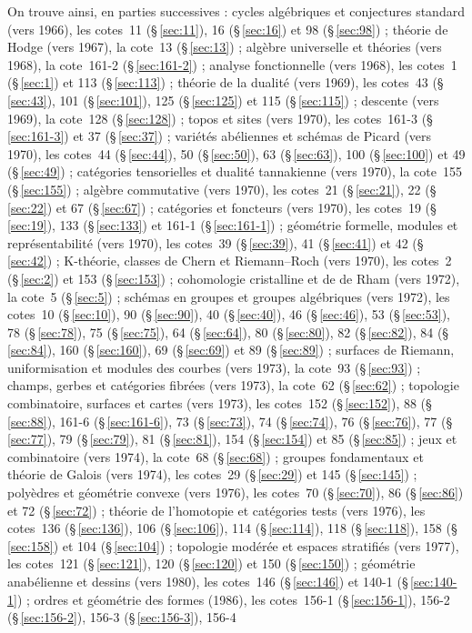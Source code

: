 \documentclass[11pt]{article}
\theoremstyle{plain}
\theoremstyle{definition}
\theoremstyle{plain}
\theoremstyle{definition}
\theoremstyle{remark}
\renewcommand{\_}{\bkunderscore\allowbreak}
\begin{document}
On trouve ainsi, en parties successives : cycles algébriques et conjectures standard (vers 1966), les cotes~11 (§\,\ref{sec:11}), 16 (§\,\ref{sec:16}) et 98 (§\,\ref{sec:98}) ; théorie de Hodge (vers 1967), la cote~13 (§\,\ref{sec:13}) ; algèbre universelle et théories (vers 1968), la cote~161-2 (§\,\ref{sec:161-2}) ; analyse fonctionnelle (vers 1968), les cotes~1 (§\,\ref{sec:1}) et 113 (§\,\ref{sec:113}) ; théorie de la dualité (vers 1969), les cotes~43 (§\,\ref{sec:43}), 101 (§\,\ref{sec:101}), 125 (§\,\ref{sec:125}) et 115 (§\,\ref{sec:115}) ; descente (vers 1969), la cote~128 (§\,\ref{sec:128}) ; topos et sites (vers 1970), les cotes~161-3 (§\,\ref{sec:161-3}) et 37 (§\,\ref{sec:37}) ; variétés abéliennes et schémas de Picard (vers 1970), les cotes~44 (§\,\ref{sec:44}), 50 (§\,\ref{sec:50}), 63 (§\,\ref{sec:63}), 100 (§\,\ref{sec:100}) et 49 (§\,\ref{sec:49}) ; catégories tensorielles et dualité tannakienne (vers 1970), la cote~155 (§\,\ref{sec:155}) ; algèbre commutative (vers 1970), les cotes~21 (§\,\ref{sec:21}), 22 (§\,\ref{sec:22}) et 67 (§\,\ref{sec:67}) ; catégories et foncteurs (vers 1970), les cotes~19 (§\,\ref{sec:19}), 133 (§\,\ref{sec:133}) et 161-1 (§\,\ref{sec:161-1}) ; géométrie formelle, modules et représentabilité (vers 1970), les cotes~39 (§\,\ref{sec:39}), 41 (§\,\ref{sec:41}) et 42 (§\,\ref{sec:42}) ; K-théorie, classes de Chern et Riemann--Roch (vers 1970), les cotes~2 (§\,\ref{sec:2}) et 153 (§\,\ref{sec:153}) ; cohomologie cristalline et de de Rham (vers 1972), la cote~5 (§\,\ref{sec:5}) ; schémas en groupes et groupes algébriques (vers 1972), les cotes~10 (§\,\ref{sec:10}), 90 (§\,\ref{sec:90}), 40 (§\,\ref{sec:40}), 46 (§\,\ref{sec:46}), 53 (§\,\ref{sec:53}), 78 (§\,\ref{sec:78}), 75 (§\,\ref{sec:75}), 64 (§\,\ref{sec:64}), 80 (§\,\ref{sec:80}), 82 (§\,\ref{sec:82}), 84 (§\,\ref{sec:84}), 160 (§\,\ref{sec:160}), 69 (§\,\ref{sec:69}) et 89 (§\,\ref{sec:89}) ; surfaces de Riemann, uniformisation et modules des courbes (vers 1973), la cote~93 (§\,\ref{sec:93}) ; champs, gerbes et catégories fibrées (vers 1973), la cote~62 (§\,\ref{sec:62}) ; topologie combinatoire, surfaces et cartes (vers 1973), les cotes~152 (§\,\ref{sec:152}), 88 (§\,\ref{sec:88}), 161-6 (§\,\ref{sec:161-6}), 73 (§\,\ref{sec:73}), 74 (§\,\ref{sec:74}), 76 (§\,\ref{sec:76}), 77 (§\,\ref{sec:77}), 79 (§\,\ref{sec:79}), 81 (§\,\ref{sec:81}), 154 (§\,\ref{sec:154}) et 85 (§\,\ref{sec:85}) ; jeux et combinatoire (vers 1974), la cote~68 (§\,\ref{sec:68}) ; groupes fondamentaux et théorie de Galois (vers 1974), les cotes~29 (§\,\ref{sec:29}) et 145 (§\,\ref{sec:145}) ; polyèdres et géométrie convexe (vers 1976), les cotes~70 (§\,\ref{sec:70}), 86 (§\,\ref{sec:86}) et 72 (§\,\ref{sec:72}) ; théorie de l'homotopie et catégories tests (vers 1976), les cotes~136 (§\,\ref{sec:136}), 106 (§\,\ref{sec:106}), 114 (§\,\ref{sec:114}), 118 (§\,\ref{sec:118}), 158 (§\,\ref{sec:158}) et 104 (§\,\ref{sec:104}) ; topologie modérée et espaces stratifiés (vers 1977), les cotes~121 (§\,\ref{sec:121}), 120 (§\,\ref{sec:120}) et 150 (§\,\ref{sec:150}) ; géométrie anabélienne et dessins (vers 1980), les cotes~146 (§\,\ref{sec:146}) et 140-1 (§\,\ref{sec:140-1}) ; ordres et géométrie des formes (1986), les cotes~156-1 (§\,\ref{sec:156-1}), 156-2 (§\,\ref{sec:156-2}), 156-3 (§\,\ref{sec:156-3}), 156-4 
\end{document}
